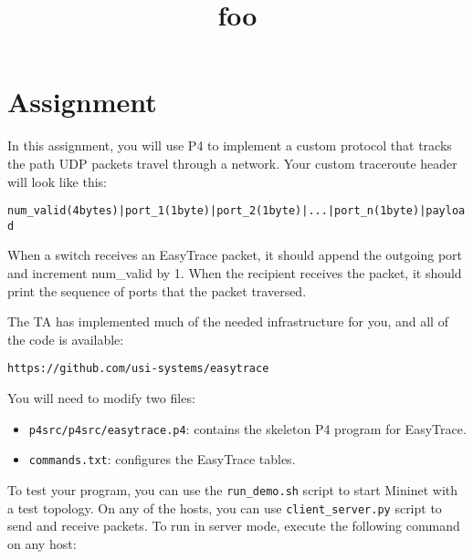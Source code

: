 \documentclass{article}
\title{foo}
\begin{document}




\section*{Assignment}


In this assignment, you will use P4 to implement a custom protocol
that tracks the path UDP packets travel through a network. Your custom
traceroute header will look like this:

\begin{alltt}
 num\_valid (4 bytes) | port\_1 (1 byte) | port\_2 (1 byte) | ... | port\_n (1 byte) | payload
\end{alltt}

\noindent
When a switch receives an EasyTrace packet, it should append the outgoing port and increment num\_valid by 1. When the recipient receives the packet, it should print the sequence of ports that the packet traversed.

The TA has implemented much of the needed infrastructure for you, and all of the code is available:

\begin{alltt}
https://github.com/usi-systems/easytrace
\end{alltt}

\noindent
You will need to modify two files:

 \begin{itemize}
 \item \texttt{p4src/p4src/easytrace.p4}: contains the skeleton P4 program for EasyTrace.
 \item \texttt{commands.txt}: configures the EasyTrace tables.
 \end{itemize}

 To test your program, you can use the \texttt{run\_demo.sh} script to start Mininet with
 a test topology. On any of the hosts, you can use  \texttt{client\_server.py} script to send and receive packets.
 To run in server mode, execute the following command on any host:
\end{document}
